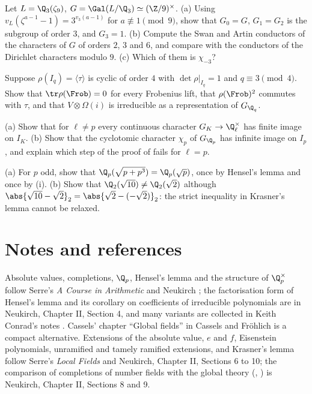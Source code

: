 \begin{exercise}\label{ex:local:ex-zeta9}
Let $L=\Q_3(\zeta_9)$, $G=\Gal(L/\Q_3)\simeq(\Z/9)^\times$. (a) Using $v_L(\zeta^{a-1}-1)=3^{v_3(a-1)}$ for $a\not\equiv1\pmod9$, show that $G_0=G$, $G_1=G_2$ is the subgroup of
order $3$, and $G_3=1$. (b) Compute the Swan and Artin conductors of the characters of $G$ of orders $2$, $3$ and $6$, and compare with the conductors of the
Dirichlet characters modulo $9$. (c) Which of them is $\chi_{-3}$?
\end{exercise}

\begin{exercise}\label{ex:local:ex-order4}
Suppose $\rho(I_q)=\langle\tau\rangle$ is cyclic of order $4$ with $\det\rho|_{I_q}=1$ and $q\equiv3\pmod4$. Show that $\tr\rho(\Frob)=0$ for every Frobenius lift, that $\rho(\Frob)^2$
commutes with $\tau$, and that $V\otimes\Omega(i)$ is irreducible as a representation of $G_{\Q_q}$.
\end{exercise}

\begin{exercise}\label{ex:local:ex-ell-equals-p}
(a) Show that for $\ell\ne p$ every continuous character $G_K\to\Q_\ell^\times$ has finite image on $I_K$. (b) Show that the cyclotomic character $\chi_p$ of
$G_{\Q_p}$ has infinite image on $I_p$, and explain which step of the proof of  fails for $\ell=p$.
\end{exercise}

\begin{exercise}\label{ex:local:ex-krasner}
(a) For $p$ odd, show that $\Q_p(\sqrt{p+p^3})=\Q_p(\sqrt p)$, once by Hensel's lemma and once by (i). (b) Show that $\Q_2(\sqrt{10})\ne\Q_2(\sqrt2)$
although $\abs{\sqrt{10}-\sqrt2}_2=\abs{\sqrt2-(-\sqrt2)}_2$: the strict inequality in Krasner's lemma cannot be relaxed.
\end{exercise}

\section{Notes and references}\label{sec:local:notes}

Absolute values, completions, $\Q_p$, Hensel's lemma and the structure of $\Q_p^\times$ follow Serre's \emph{A Course in Arithmetic} \cite[Chapter II]{SerreCourse} and
Neukirch \cite[Chapter II, Sections 1 to 5]{Neukirch}; the factorisation form of Hensel's lemma and its corollary on coefficients of irreducible polynomials
are in Neukirch, Chapter II, Section 4, and many variants are collected in Keith Conrad's notes \cite{KConradHensel}. Cassels' chapter ``Global fields'' in
Cassels and Fr\"ohlich \cite{CasselsFrohlich} is a compact alternative. Extensions of the absolute value, $e$ and $f$, Eisenstein polynomials, unramified and
tamely ramified extensions, and Krasner's lemma follow Serre's \emph{Local Fields} \cite[Chapters I to IV]{SerreLocalFields} and Neukirch, Chapter II,
Sections 6 to 10; the comparison of completions of number fields with the global theory (,
) is Neukirch, Chapter II, Sections 8 and 9.

